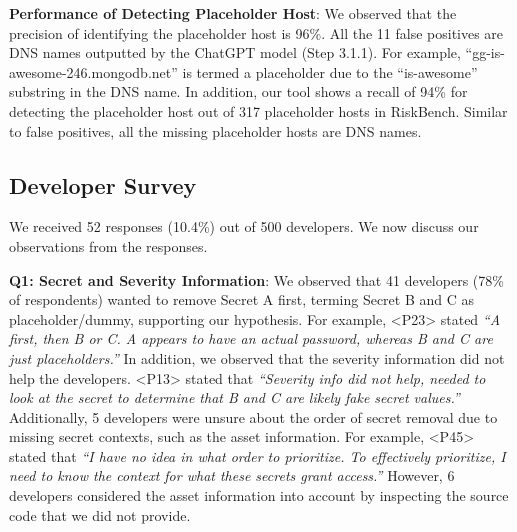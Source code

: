 \textbf{Performance of Detecting Placeholder Host}: We observed that the precision of identifying the placeholder host is 96\%. All the 11 false positives are DNS names outputted by the ChatGPT model (Step 3.1.1). For example, ``gg-is-awesome-246.mongodb.net'' is termed a placeholder due to the ``is-awesome'' substring in the DNS name. In addition, our tool shows a recall of 94\% for detecting the placeholder host out of 317 placeholder hosts in RiskBench. Similar to false positives, all the missing placeholder hosts are DNS names.

\subsection{Developer Survey} \label{DeveloperSurvey}

We received 52 responses (10.4\%) out of 500 developers. We now discuss our observations from the responses.


\textbf{Q1: Secret and Severity Information}: We observed that 41 developers (78\% of respondents) wanted to remove Secret A first, terming Secret B and C as placeholder/dummy, supporting our hypothesis. For example, <P23> stated \textit{``A first, then B or C. A appears to have an actual password, whereas B and C are just placeholders.''} In addition, we observed that the severity information did not help the developers. <P13> stated that \textit{``Severity info did not help, needed to look at the secret to determine that B and C are likely fake secret values.''} Additionally, 5 developers were unsure about the order of secret removal due to missing secret contexts, such as the asset information. For example, <P45> stated that \textit{``I have no idea in what order to prioritize. To effectively prioritize, I need to know the context for what these secrets grant access.''} However, 6 developers considered the asset information into account by inspecting the source code that we did not provide.


